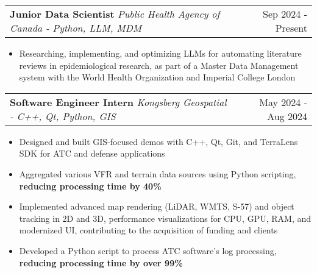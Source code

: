 \documentclass[letterpaper,11pt]{article}
\makeatletter
\newcommand{\resumeItem}[1]{
  \item\small{
    {#1 \vspace{-3pt}}
  }
}
\newcommand{\resumeSubheading}[3]{
    \item
    \begin{tabular*}{0.97\textwidth}[t]{l@{\extracolsep{\fill}}r}
      \textbf{#1} \textbar \textit{ #2} & #3 \\
    \end{tabular*}\vspace{-7.5pt}
}
\newcommand{\resumeItemListStart}{\begin{itemize}}
\newcommand{\resumeItemListEnd}{\end{itemize}\vspace{-5pt}}
\makeatother
\begin{document}
      \resumeSubheading
      {Junior Data Scientist}{Public Health Agency of Canada - Python, LLM, MDM }{Sep 2024 - Present}
      \resumeItemListStart
      \resumeItem{Researching, implementing, and optimizing LLMs for automating literature reviews in epidemiological research, as part of a Master Data Management system with the World Health Organization and Imperial College London}
      \resumeItemListEnd


      \resumeSubheading
      {Software Engineer Intern}{Kongsberg Geospatial - C++, Qt, Python, GIS}{May 2024 - Aug 2024}
      \resumeItemListStart
      \resumeItem{Designed and built GIS-focused demos with C++, Qt, Git, and TerraLens SDK for ATC and defense applications}
      \resumeItem{Aggregated various VFR and terrain data sources using Python scripting, \textbf{reducing processing time by 40\%}}
      \resumeItem{Implemented advanced map rendering (LiDAR, WMTS, S-57) and object tracking in 2D and 3D, performance visualizations for CPU, GPU, RAM, and modernized UI, contributing to the acquisition of funding and clients}
        \resumeItem{Developed a Python script to process ATC software's log processing, \textbf{reducing processing time by over 99\%}}
      \resumeItemListEnd
\end{document}
